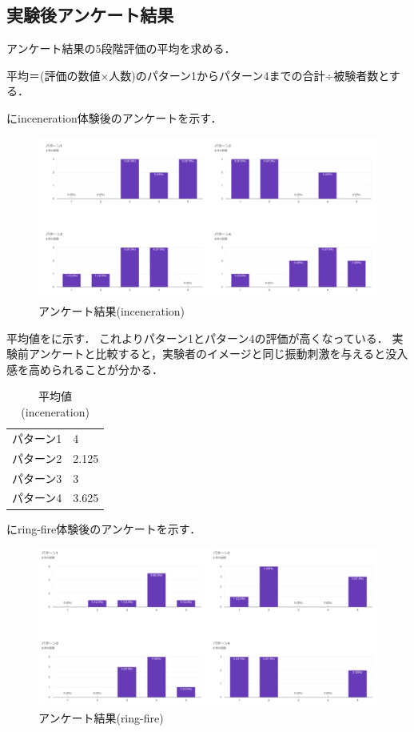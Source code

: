 \subsection{実験後アンケート結果}
アンケート結果の5段階評価の平均を求める．

平均＝(評価の数値×人数)のパターン1からパターン4までの合計÷被験者数とする．

にinceneration体験後のアンケートを示す．

\begin{figure}[h]
  \centering
  \includegraphics[clip,width=15cm]{./fig/incenerationAnk.png}
  \caption{アンケート結果(inceneration)}\label{inceAnk}
  \end{figure}
  


平均値をに示す．
これよりパターン1とパターン4の評価が高くなっている．
実験前アンケートと比較すると，実験者のイメージと同じ振動刺激を与えると没入感を高められることが分かる．
\begin{table}[h]
    \caption{平均値(inceneration)}
    \centering
    \begin{tabular}{l|l}
    \hline
    \hline
    パターン1 & 4\\
    パターン2 & 2.125\\
    パターン3 & 3\\
    パターン4 & 3.625\\
    \hline
    \end{tabular}
    \label{tab;inceAvera}
\end{table}

\newpage

にring-fire体験後のアンケートを示す．

\begin{figure}[h]
  \centering
  \includegraphics[clip,width=15cm]{fig/ringfireAnk.png}
  \caption{アンケート結果(ring-fire)}\label{ringAnk}
  \end{figure}


